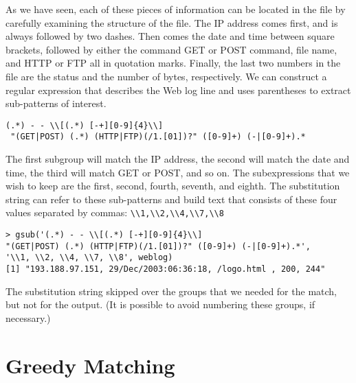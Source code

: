 As we have seen, each of these pieces of information can be located in
the file by carefully examining the structure of the file.  The IP
address comes first, and is always followed by two dashes.  Then comes
the date and time between square brackets, followed by either the
command GET or POST command, file name, and HTTP or FTP all in
quotation marks.  Finally, the last two numbers in the file are the
status and the number of bytes, respectively.  We can construct a
regular expression that describes the Web log line and uses
parentheses to extract sub-patterns of interest.  
{\footnotesize{
\begin{verbatim}
(.*) - - \\[(.*) [-+][0-9]{4}\\] 
 "(GET|POST) (.*) (HTTP|FTP)(/1.[01])?" ([0-9]+) (-|[0-9]+).*
\end{verbatim}
}}
\noindent 
The first subgroup will match the IP address, the second will
match the date and time, the third will match GET or POST, and so on.
The subexpressions that we wish to keep are the first, second, fourth,
seventh, and eighth.  The substitution string can refer to these
sub-patterns and build text that consists of these four values
separated by commas: \verb+\\1,\\2,\\4,\\7,\\8+ 
{\footnotesize{
\begin{verbatim}
> gsub('(.*) - - \\[(.*) [-+][0-9]{4}\\] 
"(GET|POST) (.*) (HTTP|FTP)(/1.[01])?" ([0-9]+) (-|[0-9]+).*', 
'\\1, \\2, \\4, \\7, \\8', weblog)
[1] "193.188.97.151, 29/Dec/2003:06:36:18, /logo.html , 200, 244"
\end{verbatim}
}}
\noindent 
The substitution string skipped over the groups that we needed
for the match, but not for the output.  (It is possible to avoid
numbering these groups, if necessary.)


\section{Greedy Matching}

